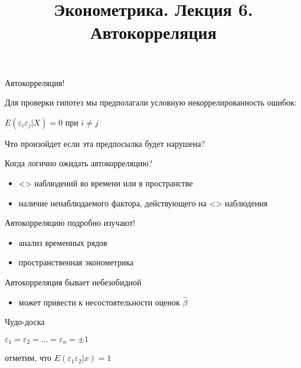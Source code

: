 \documentclass[ignorenonframetext,]{beamer}
\title{Эконометрика. Лекция 6. Автокорреляция}
\begin{document}
\frame{\titlepage}

\begin{frame}{Автокорреляция!}

Для проверки гипотез мы предполагали условную некоррелированность
ошибок:

$E(\varepsilon_i \varepsilon_j | X)=0$ при $i\neq j$

Что произойдет если эта предпосылка будет нарушена?

\end{frame}

\begin{frame}{Когда логично ожидать автокорреляцию?}

\begin{itemize}
\item
  \textless{}\textgreater{} наблюдений во времени или в пространстве
\item
  наличие ненаблюдаемого фактора, действующего на
  \textless{}\textgreater{} наблюдения
\end{itemize}

\end{frame}

\begin{frame}{Автокорреляцию подробно изучают!}

\begin{itemize}
\item
  анализ временных рядов
\item
  пространственная эконометрика
\end{itemize}

\end{frame}

\begin{frame}{Автокорреляция бывает небезобидной}

\begin{itemize}
\itemsep1pt\parskip0pt
\item
  может привести к несостоятельности оценок $\hat{\beta}$
\end{itemize}

\end{frame}

\begin{frame}{Чудо-доска}

$\varepsilon_1=\varepsilon_2=\ldots=\varepsilon_n=\pm 1$

отметим, что $E(\varepsilon_1\varepsilon_2 | x)=1$

\end{frame}
\end{document}
